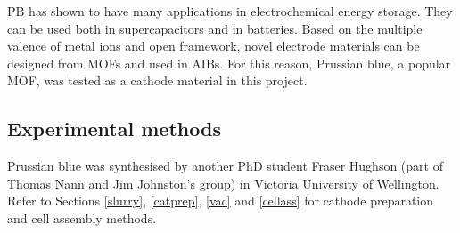 PB has shown to have many applications in electrochemical energy storage. They can be used both in supercapacitors and in batteries. Based on the multiple valence of metal ions and open framework, novel electrode materials can be designed from MOFs and used in AIBs. For this reason, Prussian blue, a popular MOF, was tested as a cathode material in this project. 

\subsection{Experimental methods}
Prussian blue was synthesised by another PhD student Fraser Hughson (part of Thomas Nann and Jim Johnston's group)  in Victoria University of Wellington. Refer to Sections \ref{slurry}, \ref{catprep}, \ref{vac} and \ref{cellass} for cathode preparation and cell assembly methods. 
